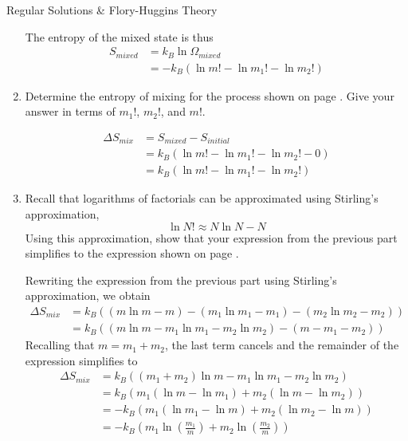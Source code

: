 \begin{activity}{Regular Solutions \& Flory-Huggins Theory}
\begin{exercises}
\begin{enumerate}
\begin{solution}{}
						The entropy of the mixed state is thus
						\begin{align*}
							S_{mixed} &= k_B \ln \Omega_{mixed}\\
							&= -k_B(\ln m! - \ln m_1! - \ln m_2!)
						\end{align*}
					
					\end{solution}
	
				\item Determine the entropy of mixing for the process shown on page \pageref{\labelbase:eqn:idealS}.  Give your answer in terms of $m_1!$, $m_2!$, and $m!$.
				
					\begin{solution}{}
						\begin{align*}
							\Delta S_{mix} &= S_{mixed} - S_{initial}\\
							 &= k_B(\ln m! - \ln m_1! - \ln m_2! - 0) \\
							 &= k_B(\ln m! - \ln m_1! - \ln m_2!)
						\end{align*}
					
					\end{solution}
				
				\item Recall that logarithms of factorials can be approximated using Stirling's approximation,
	\begin{equation*}
		\ln N! \approx N \ln N - N \label{eqn:stirling}
	\end{equation*}
					Using this approximation, show that your expression from the previous part simplifies to the expression shown on page \pageref{\labelbase:eqn:idealS}.
				
					\begin{solution}{}
						Rewriting the expression from the previous part using Stirling's approximation, we obtain
						\begin{align*}
							\Delta S_{mix} &= k_B((m \ln m - m) - (m_1 \ln m_1 -m_1) - (m_2 \ln m_2 - m_2))\\
								&= k_B((m\ln m - m_1 \ln m_1 - m_2 \ln m_2) - (m - m_1 - m_2))
						\end{align*}
						Recalling that $m = m_1 + m_2$, the last term cancels and the remainder of the expression simplifies to
						\begin{align*}
							\Delta S_{mix} &= k_B((m_1 + m_2) \ln m - m_1 \ln m_1 - m_2 \ln m_2)\\
								&= k_B(m_1(\ln m - \ln m_1) + m_2(\ln m - \ln m_2))\\
								&= -k_B(m_1(\ln m_1 - \ln m) + m_2(\ln m_2 - \ln m))\\
								&= -k_B\left( m_1 \ln \left(\frac{m_1}{m} \right) + m_2 \ln \left(\frac{m_2}{m}\right)\right) 
						\end{align*}
					

\end{solution}
\end{enumerate}
\end{exercises}
\end{activity}
